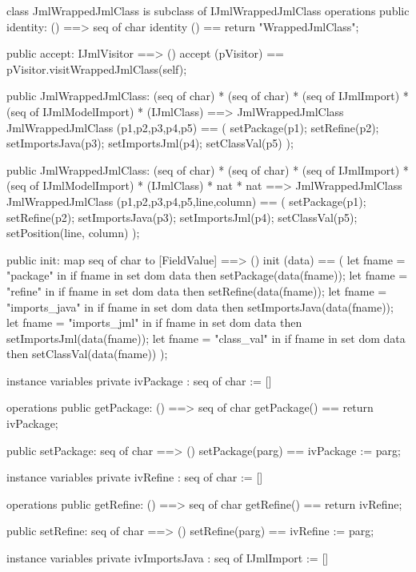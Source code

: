 \begin{vdm_al}
class JmlWrappedJmlClass is subclass of IJmlWrappedJmlClass
operations
  public identity: () ==> seq of char
  identity () == return "WrappedJmlClass";

  public accept: IJmlVisitor ==> ()
  accept (pVisitor) == pVisitor.visitWrappedJmlClass(self);

  public JmlWrappedJmlClass:
    (seq of char) *
    (seq of char) *
    (seq of IJmlImport) *
    (seq of IJmlModelImport) *
    (IJmlClass) ==> JmlWrappedJmlClass
  JmlWrappedJmlClass (p1,p2,p3,p4,p5) == 
    ( setPackage(p1);
      setRefine(p2);
      setImportsJava(p3);
      setImportsJml(p4);
      setClassVal(p5) );

  public JmlWrappedJmlClass:
    (seq of char) *
    (seq of char) *
    (seq of IJmlImport) *
    (seq of IJmlModelImport) *
    (IJmlClass) *
    nat *
    nat ==> JmlWrappedJmlClass
  JmlWrappedJmlClass (p1,p2,p3,p4,p5,line,column) == 
    ( setPackage(p1);
      setRefine(p2);
      setImportsJava(p3);
      setImportsJml(p4);
      setClassVal(p5);
      setPosition(line, column) );

  public init: map seq of char to [FieldValue] ==> ()
  init (data) ==
    ( let fname = "package" in
        if fname in set dom data
        then setPackage(data(fname));
      let fname = "refine" in
        if fname in set dom data
        then setRefine(data(fname));
      let fname = "imports_java" in
        if fname in set dom data
        then setImportsJava(data(fname));
      let fname = "imports_jml" in
        if fname in set dom data
        then setImportsJml(data(fname));
      let fname = "class_val" in
        if fname in set dom data
        then setClassVal(data(fname)) );

instance variables
  private ivPackage : seq of char := []

operations
  public getPackage: () ==> seq of char
  getPackage() == return ivPackage;

  public setPackage: seq of char ==> ()
  setPackage(parg) == ivPackage := parg;

instance variables
  private ivRefine : seq of char := []

operations
  public getRefine: () ==> seq of char
  getRefine() == return ivRefine;

  public setRefine: seq of char ==> ()
  setRefine(parg) == ivRefine := parg;

instance variables
  private ivImportsJava : seq of IJmlImport := []


\end{vdm_al}
